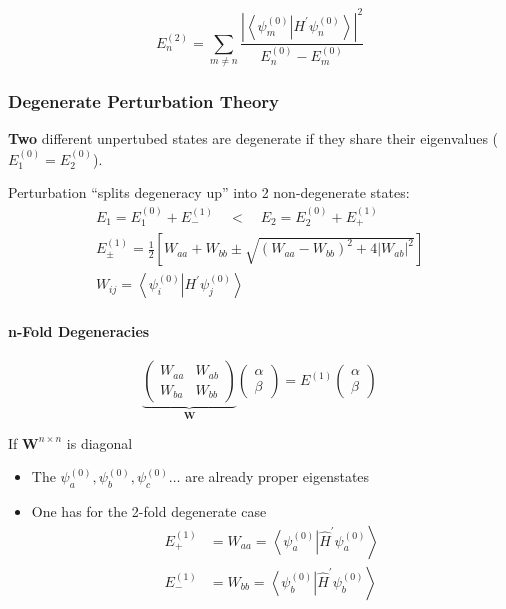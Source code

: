 \begin{equation*}
    E_{n}^{(2)}=\sum_{m\neq n}\frac{\left|\left\langle\psi_{m}^{(0)}\right|H^{\prime}\left.\psi_{n}^{(0)}\right\rangle\right|^{2}}{E_{n}^{(0)}-E_{m}^{(0)}}
\end{equation*}

\subsubsection{Degenerate Perturbation Theory}
\textbf{Two} different unpertubed states are degenerate if they share their eigenvalues ($E_1^{(0)} = E_2^{(0)}$).

\newpar{}
Perturbation ``splits degeneracy up'' into 2 non-degenerate states:
\noindent\begin{gather*}
    E_1 = E_1^{(0)} + E_{-}^{(1)} \quad < \quad E_2 = E_2^{(0)} + E_{+}^{(1)}\\
    E_{\pm}^{(1)}=\frac{1}{2}\left[W_{aa}+W_{bb}\pm\sqrt{{(W_{aa}-W_{bb})}^{2}+4 |W_{ab}|^{2}}\right]\\
    W_{ij}=\left\langle\psi_{i}^{(0)} \right| H^{\prime} \left.\psi_{j}^{(0)}\right\rangle
\end{gather*}

\paragraph{n-Fold Degeneracies}
\noindent\begin{equation*}
    \underbrace{
        \left(\begin{array}{cc}
            W_{aa} & W_{ab} \\
            W_{ba} & W_{bb}
        \end{array}\right)}_{\mathbf{W}}
    \left(\begin{array}{c}
            \alpha \\
            \beta
        \end{array}\right)
    =E^{(1)}\left(\begin{array}{c}
            \alpha \\
            \beta
        \end{array}\right)
\end{equation*}

If $\mathbf{W}^{n\times n}$ is diagonal
\begin{itemize}
    \item The $\psi_a^{(0)},\psi_b^{(0)},\psi_c^{(0)} \dots $ are already proper eigenstates
    \item One has for the 2-fold degenerate case
          \begin{align*}
              E_{+}^{(1)} & =W_{aa}=\left\langle\psi_{a}^{(0)}\right|\left.\widehat{H}^{\prime}\psi_{a}^{(0)}\right\rangle \\
              E_{-}^{(1)} & =W_{bb}=\left\langle\psi_{b}^{(0)}\right|\left.\widehat{H}^{\prime}\psi_{b}^{(0)}\right\rangle
          \end{align*}
\end{itemize}

